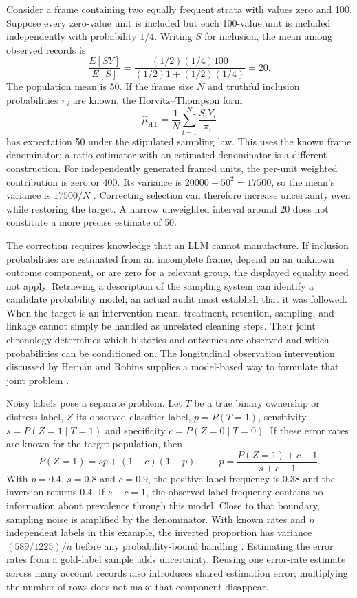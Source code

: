 Consider a frame containing two equally frequent strata with values zero and
100. Suppose every zero-value unit is included but each 100-value unit is
included independently with probability $1/4$. Writing $S$ for inclusion,
the mean among observed records is
\[
 \frac{E[SY]}{E[S]}=
 \frac{(1/2)(1/4)100}{(1/2)1+(1/2)(1/4)}=20.
\]
The population mean is 50. If the frame size $N$ and truthful inclusion
probabilities $\pi_i$ are known, the Horvitz--Thompson form
\[
 \widehat\mu_{\mathrm{HT}}=
 \frac1N\sum_{i=1}^N\frac{S_iY_i}{\pi_i}
\]
has expectation 50 under the stipulated sampling law. This uses the known
frame denominator; a ratio estimator with an estimated denominator is a
different construction. For independently generated framed units, the
per-unit weighted contribution is zero or 400. Its variance is
$20000-50^2=17500$, so the mean's variance is $17500/N$
\citep{exec14_workflow_oracle}. Correcting selection can therefore increase
uncertainty even while restoring the target. A narrow unweighted interval
around 20 does not constitute a more precise estimate of 50.

The correction requires knowledge that an LLM cannot manufacture. If inclusion
probabilities are estimated from an incomplete frame, depend on an unknown
outcome component, or are zero for a relevant group, the displayed equality
need not apply. Retrieving a description of the sampling system can identify
a candidate probability model; an actual audit must establish that it was
followed. When the target is an intervention mean, treatment, retention,
sampling, and linkage cannot simply be handled as unrelated cleaning steps.
Their joint chronology determines which histories and outcomes are observed
and which probabilities can be conditioned on. The longitudinal observation
intervention discussed by Hern\'an and Robins supplies a model-based way to
formulate that joint problem \citep{hernan2020}.

Noisy labels pose a separate problem. Let $T$ be a true binary ownership or
distress label, $Z$ its observed classifier label, $p=P(T=1)$, sensitivity
$s=P(Z=1\mid T=1)$ and specificity $c=P(Z=0\mid T=0)$. If these error rates are
known for the target population, then
\[
 P(Z=1)=sp+(1-c)(1-p),\qquad
 p=\frac{P(Z=1)+c-1}{s+c-1}.
\]
With $p=0.4$, $s=0.8$ and $c=0.9$, the positive-label frequency is 0.38 and
the inversion returns 0.4. If $s+c=1$, the observed label frequency contains
no information about prevalence through this model. Close to that boundary,
sampling noise is amplified by the denominator. With known rates and $n$
independent labels in this example, the inverted proportion has variance
$(589/1225)/n$ before any probability-bound handling
\citep{exec14_workflow_oracle}. Estimating the error rates from a gold-label
sample adds uncertainty. Reusing one error-rate estimate across many account
records also introduces shared estimation error; multiplying the number of
rows does not make that component disappear.


